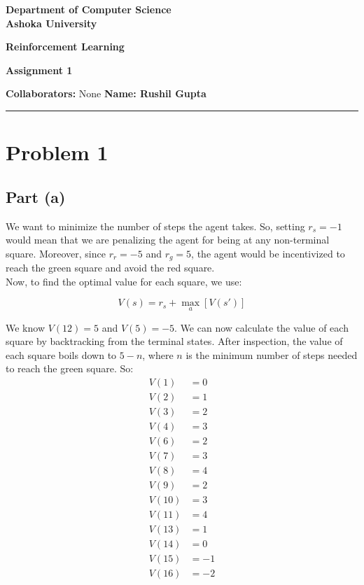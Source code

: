 \documentclass[a4paper]{article}
\begin{document}
\begin{center}
{\large \bf \color{red}  Department of Computer Science} \\
{\large \bf \color{red}  Ashoka University} \\

\vspace{0.1in}

{\large \bf \color{blue} Reinforcement Learning} \\

\vspace{0.05in}

    { \bf \color{YellowOrange} Assignment 1}
\end{center}
\medskip

{\textbf{Collaborators:} None} \hfill {\textbf{Name: Rushil Gupta} }

\bigskip
\hrule


\section*{Problem 1}
\subsection*{Part (a)}

We want to minimize the number of steps the agent takes. So, setting $r_s = -1$ would mean that we are penalizing the agent for being at any non-terminal square. Moreover, since $r_r = -5$ and $r_g = 5$, the agent would be incentivized to reach the green square and avoid the red square.\\

\noindent Now, to find the optimal value for each square, we use:

\[
V(s) = r_s + \max_{a} \left[V(s') \right]
\]

\noindent We know $V(12) = 5$ and $V(5) = -5$. We can now calculate the value of each square by backtracking from the terminal states. After inspection, the value of each square boils down to $5 - n$, where $n$ is the minimum number of steps needed to reach the green square. So:
\begin{align*}
V(1) &= 0 \\
V(2) &= 1 \\
V(3) &= 2 \\
V(4) &= 3 \\
V(6) &= 2 \\
V(7) &= 3 \\
V(8) &= 4 \\
V(9) &= 2 \\
V(10) &= 3 \\
V(11) &= 4 \\
V(13) &= 1 \\
V(14) &= 0 \\
V(15) &= -1 \\
V(16) &= -2 \\
\end{align*}
\end{document}
